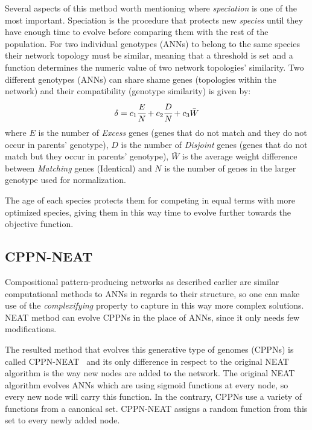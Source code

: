 \documentclass{sig-alternate}
\begin{document}
Several aspects of this method worth mentioning where \emph{speciation} is one of the most important. Speciation is the procedure that protects new \emph{species} until they have enough time to evolve before comparing them with the rest of the population. For two individual genotypes (ANNs) to belong to the same species their network topology must be similar, meaning that a threshold is set and a function determines the numeric value of two network topologies' similarity. Two different genotypes (ANNs) can share shame genes (topologies within the network) and their compatibility (genotype similarity) is given by:
\begin{equation}
\label{CompatibilityEquation}
\delta = c_1 \cfrac{E}{N} + c_2 \cfrac{D}{N} + c_3 \bar{W}
\end{equation}
where $E$ is the number of \emph{Excess} genes (genes that do not match and they do not occur in parents' genotype), $D$ is the number of \emph{Disjoint} genes (genes that do not match but they occur in parents' genotype), $\bar{W}$ is the average weight difference between \emph{Matching} genes (Identical) and $N$ is the number of genes in the larger genotype used for normalization.

The age of each species protects them for competing in equal terms with more optimized species, giving them in this way time to evolve further towards the objective function.


\subsection{CPPN-NEAT}

Compositional pattern-producing networks as described earlier are similar computational methods to ANNs in regards to their structure, so one can make use of the \emph{complexifying} property to capture in this way more complex solutions. NEAT method can evolve CPPNs in the place of ANNs, since it only needs few modifications. 

The resulted method that evolves this generative type of genomes (CPPNs) is called CPPN-NEAT~\cite{stanley2007compositional} and its only difference in respect to the original NEAT algorithm is the way new nodes are added to the network. The original NEAT algorithm evolves ANNs which are using sigmoid functions at every node, so every new node will carry this function.
In the contrary, CPPNs use a variety of functions from a canonical set. CPPN-NEAT assigns a random function from this set to every newly added node. 
\end{document}
